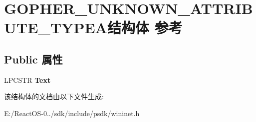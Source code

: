 \hypertarget{struct_g_o_p_h_e_r___u_n_k_n_o_w_n___a_t_t_r_i_b_u_t_e___t_y_p_e_a}{}\section{G\+O\+P\+H\+E\+R\+\_\+\+U\+N\+K\+N\+O\+W\+N\+\_\+\+A\+T\+T\+R\+I\+B\+U\+T\+E\+\_\+\+T\+Y\+P\+E\+A结构体 参考}
\label{struct_g_o_p_h_e_r___u_n_k_n_o_w_n___a_t_t_r_i_b_u_t_e___t_y_p_e_a}
\subsection*{Public 属性}
\begin{DoxyCompactItemize}
\item 
\mbox{\label{struct_g_o_p_h_e_r___u_n_k_n_o_w_n___a_t_t_r_i_b_u_t_e___t_y_p_e_a_a0034fef47f89412e5fc5620d962c4e5d}} 
L\+P\+C\+S\+TR {\bfseries Text}
\end{DoxyCompactItemize}


该结构体的文档由以下文件生成\+:\begin{DoxyCompactItemize}
\item 
E\+:/\+React\+O\+S-\/0../sdk/include/psdk/wininet.\+h\end{DoxyCompactItemize}
